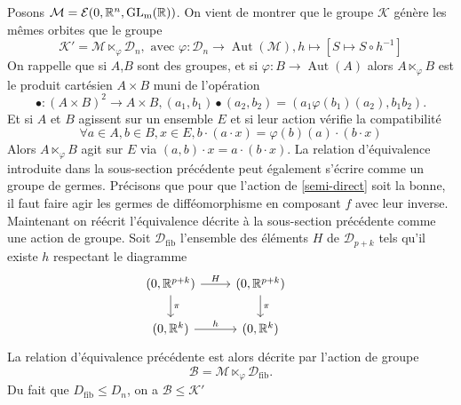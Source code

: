 \documentclass[memoire.tex]{subfiles}
\begin{document}
Posons $\mathcal{M}=\mathcal{E}(0,\mathbb{R}^n,\operatorname{GL_m}(\mathbb{R}))$.
On vient de montrer que le groupe $\mathcal{K}$ génère les mêmes orbites que le groupe
\begin{equation}\label{semi-direct}
    \mathcal{K'}=\mathcal{M}\ltimes_{\varphi} \mathcal{D}_n,\text{ avec }\varphi: \mathcal{D}_n\rightarrow \operatorname*{Aut}(\mathcal{M}), h\mapsto \left[ S\mapsto S\circ h^{-1}\right]
\end{equation}
On rappelle que si $A$,$B$ sont des groupes, et si $\varphi: B\rightarrow \operatorname*{Aut}(A)$ alors $A\ltimes_{\varphi} B$ est le produit cartésien $A\times B$ muni de l'opération 
\begin{equation*}
    \bullet: (A\times B)^2\rightarrow A\times B, (a_1,b_1)\bullet (a_2,b_2)=(a_1\varphi(b_1)(a_2),b_1b_2).
\end{equation*}
Et si $A$ et $B$ agissent sur un ensemble $E$ et si leur action vérifie la compatibilité
\begin{equation*}
    \forall a\in A,b\in B,x\in E, b\cdot (a\cdot x)=\varphi(b)(a)\cdot (b\cdot x)
\end{equation*} 
Alors $A\ltimes_{\varphi} B$ agit sur $E$ via $(a,b)\cdot x= a\cdot (b\cdot x)$.
La relation d'équivalence 
introduite dans la sous-section précédente peut également s'écrire comme un groupe de germes. Précisons que pour que l'action de \ref{semi-direct} soit la bonne, il faut faire agir les germes de difféomorphisme en composant $f$ avec leur inverse. Maintenant on réécrit l'équivalence décrite à la sous-section précédente comme une action de groupe. Soit  $\mathcal D_{\mathrm{fib}}$ l'ensemble des éléments $H$ de $\mathcal{D}_{p+k}$ tels qu'il existe $h$ respectant le diagramme
\[\begin{tikzcd}
	{(0,\R^{p+k})} & {(0,\R^{p+k})} & \\
	{(0,\R^k)} & {(0,\R^k)} 
	\arrow["H", from=1-1, to=1-2]
	\arrow["\pi", from=1-1, to=2-1]
	\arrow["\pi", from=1-2, to=2-2]
	\arrow["h", from=2-1, to=2-2]
\end{tikzcd}\]
La relation d'équivalence précédente est alors décrite par l'action de groupe
\begin{equation*}
    \mathcal{B}=\mathcal{M}\ltimes_{\varphi}\mathcal{D}_{\text{fib}}.
\end{equation*}
Du fait que $D_{\text{fib}}\leq D_n$, on a $\mathcal{B}\leq \mathcal{K}'$
\end{document}
